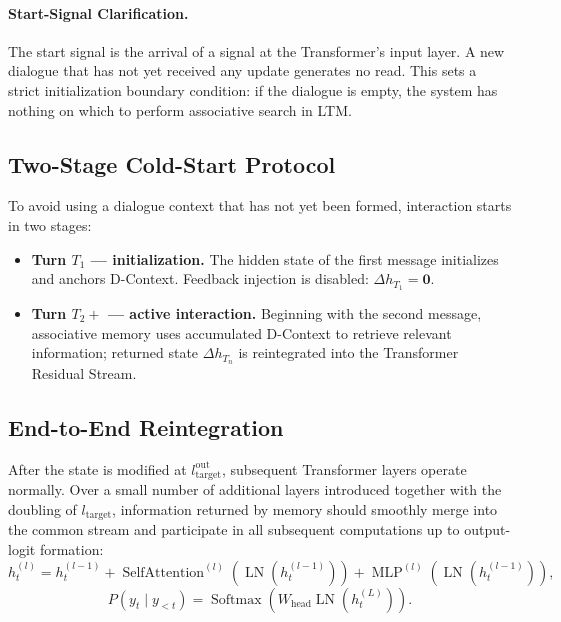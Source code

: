 \documentclass[11pt,a4paper]{article}
\begin{document}
\paragraph{Start-Signal Clarification.}
The start signal is the arrival of a signal at the Transformer's input layer. A new dialogue that has not yet received any update generates no read. This sets a strict initialization boundary condition: if the dialogue is empty, the system has nothing on which to perform associative search in LTM.

\subsection*{Two-Stage Cold-Start Protocol}
To avoid using a dialogue context that has not yet been formed, interaction starts in two stages:
\begin{itemize}
\item \textbf{Turn $T_1$ --- initialization.} The hidden state of the first message initializes and anchors D-Context. Feedback injection is disabled: $\Delta h_{T_1}=\mathbf 0$.
\item \textbf{Turn $T_2+$ --- active interaction.} Beginning with the second message, associative memory uses accumulated D-Context to retrieve relevant information; returned state $\Delta h_{T_n}$ is reintegrated into the Transformer Residual Stream.
\end{itemize}

\subsection*{End-to-End Reintegration}
After the state is modified at $l_{\text{target}}^{\text{out}}$, subsequent Transformer layers operate normally. Over a small number of additional layers introduced together with the doubling of $l_{\text{target}}$, information returned by memory should smoothly merge into the common stream and participate in all subsequent computations up to output-logit formation:
\begin{equation}
h_t^{(l)}=h_t^{(l-1)}+\operatorname{SelfAttention}^{(l)}\!\left(\operatorname{LN}(h_t^{(l-1)})\right)+\operatorname{MLP}^{(l)}\!\left(\operatorname{LN}(h_t^{(l-1)})\right),
\end{equation}
\begin{equation}
P(y_t\mid y_{<t})=\operatorname{Softmax}\!\left(W_{\text{head}}\operatorname{LN}(h_t^{(L)})\right).
\end{equation}
\end{document}
